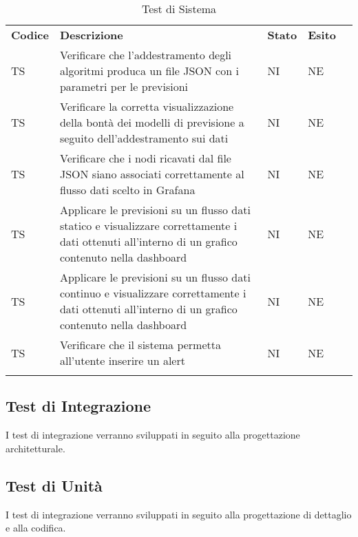 \begin{longtable} {
		>{}p{15mm} 
		>{}p{79.5mm}
		>{}p{15mm} 
		>{}p{15mm}
		>{}p{0mm}}
	\rowcolor{gray!50}
	\textbf{Codice} & \textbf{Descrizione} & \textbf{Stato} & \textbf{Esito} &\TBstrut \\
	TS & Verificare che l'addestramento degli algoritmi produca un file JSON con i parametri per le previsioni & NI & NE  &\TBstrut \\ [2mm]
	TS & Verificare la corretta visualizzazione della bontà dei modelli di previsione a seguito dell'addestramento sui dati & NI & NE  &\TBstrut \\ [2mm]
	TS & Verificare che i nodi ricavati dal file JSON siano associati correttamente al flusso dati scelto in Grafana\glo & NI & NE  &\TBstrut \\ [2mm]
	TS & Applicare le previsioni su un flusso dati statico e visualizzare correttamente i dati ottenuti all'interno di un grafico contenuto nella dashboard\glo & NI & NE  &\TBstrut \\ [2mm]
	TS & Applicare le previsioni su un flusso dati continuo e visualizzare correttamente i dati ottenuti all'interno di un grafico contenuto nella dashboard\glo & NI & NE  &\TBstrut \\ [2mm]
	TS & Verificare che il sistema permetta all'utente inserire un alert\glo & NI & NE  &\TBstrut \\ [2mm]
	\rowcolor{white}
	\caption{Test di Sistema}
\end{longtable}


\subsection{Test di Integrazione}
I test di integrazione verranno sviluppati in seguito alla progettazione architetturale.

\subsection{Test di Unità}
I test di integrazione verranno sviluppati in seguito alla progettazione di dettaglio e alla codifica.
